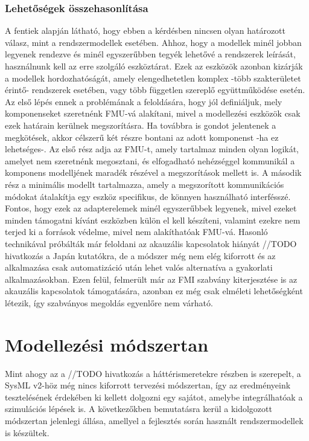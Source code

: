         \subsubsection{Lehetőségek összehasonlítása}
        A fentiek alapján látható, hogy ebben a kérdésben nincsen olyan határozott válasz, mint a rendszermodellek esetében.
        Ahhoz, hogy a modellek minél jobban legyenek rendezve és minél egyszerűbben tegyék lehetővé a rendszerek leírását, használnunk kell az erre szolgáló eszköztárat.
        Ezek az eszközök azonban kizárják a modellek hordozhatóságát, amely elengedhetetlen komplex -több szakterületet érintő- rendszerek esetében, vagy több független szereplő együttműködése esetén.
        Az első lépés ennek a problémának a feloldására, hogy jól definiáljuk, mely komponenseket szeretnénk FMU-vá alakítani, mivel a modellezési eszközök csak ezek határain kerülnek megszorításra.
        Ha továbbra is gondot jelentenek a megkötések, akkor célszerű két részre bontani az adott komponenst -ha ez lehetséges-.
        Az első rész adja az FMU-t, amely tartalmaz minden olyan logikát, amelyet nem szeretnénk megosztani, és elfogadható nehézséggel kommunikál a komponens modelljének maradék részével a megszorítások mellett is.
        A második rész a minimális modellt tartalmazza, amely a megszorított kommunikációs módokat átalakítja egy eszköz specifikus, de könnyen használható interfésszé.
        Fontos, hogy ezek az adapterelemek minél egyszerűbbek legyenek, mivel ezeket minden támogatni kívánt eszközben külön el kell készíteni, valamint ezekre nem terjed ki a források védelme, mivel nem alakíthatóak FMU-vá.
        Hasonló technikával próbálták már feloldani az akauzális kapcsolatok hiányát //TODO hivatkozás a Japán kutatókra, de a módszer még nem elég kiforrott és az alkalmazása csak automatizáció után lehet valós alternatíva a gyakorlati alkalmazásokban.
        Ezen felül, felmerült már az FMI szabvány kiterjesztése is az akauzális kapcsolatok támogatására, azonban ez még csak elméleti lehetőségként létezik, így szabványos megoldás egyenlőre nem várható.

\section{Modellezési módszertan}
Mint ahogy az a //TODO hivatkozás a háttérismeretekre részben is szerepelt, a SysML v2-höz még nincs kiforrott tervezési módszertan, így az eredményeink tesztelésének érdekében ki kellett dolgozni egy sajátot, amelybe integrálhatóak a szimulációs lépések is.
A következőkben bemutatásra kerül a kidolgozott módszertan jelenlegi állása, amellyel a fejlesztés során használt rendszermodellek is készültek.
    
